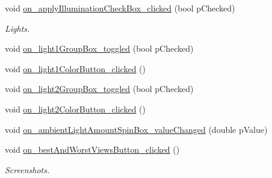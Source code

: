 \begin{DoxyCompactItemize}
void \hyperlink{class_main_module_controller_afabc3db064cc419200457e7bc5a20fb7}{on\+\_\+apply\+Illumination\+Check\+Box\+\_\+clicked} (bool p\+Checked)
\begin{DoxyCompactList}\small\item\em Lights. \end{DoxyCompactList}\item 
void \hyperlink{class_main_module_controller_aa013c4238abf9ff373ea5cd0ca0d2867}{on\+\_\+light1\+Group\+Box\+\_\+toggled} (bool p\+Checked)
\item 
void \hyperlink{class_main_module_controller_ae71d745040ee6bb686da33e28c922653}{on\+\_\+light1\+Color\+Button\+\_\+clicked} ()
\item 
void \hyperlink{class_main_module_controller_a26fe03dac2c5a80532ed6aed0dce5423}{on\+\_\+light2\+Group\+Box\+\_\+toggled} (bool p\+Checked)
\item 
void \hyperlink{class_main_module_controller_aa7c26af357d7e2e023dc9d4861e39ca1}{on\+\_\+light2\+Color\+Button\+\_\+clicked} ()
\item 
void \hyperlink{class_main_module_controller_af84df9a1ee02016e8efe65ff420010d5}{on\+\_\+ambient\+Light\+Amount\+Spin\+Box\+\_\+value\+Changed} (double p\+Value)
\item 
void \hyperlink{class_main_module_controller_aa290bece1734cf667e7c66bb7e29509f}{on\+\_\+best\+And\+Worst\+Views\+Button\+\_\+clicked} ()
\begin{DoxyCompactList}\small\item\em Screenshots. \end{DoxyCompactList}\end{DoxyCompactItemize}
